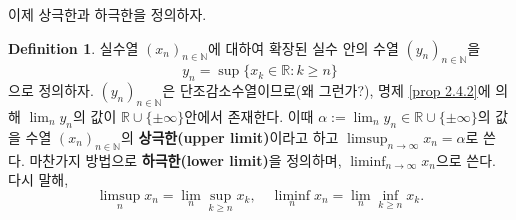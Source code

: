 \documentclass[11pt]{book}
\numberwithin{equation}{chapter}
\def\NN{\mathbb{N}}
\def\RR{\mathbb{R}}
\theoremstyle{definition}
\newtheorem{defn}[thm]{Definition}
\begin{document}
이제 상극한과 하극한을 정의하자.

    \begin{defn} \label{def 2.4.3}
        실수열 \((x_n)_{n \in \NN}\)에 대하여 확장된 실수 안의 수열 \((y_n)_{n \in \NN}\)을
        \[
        y_n = \sup \{x_k \in \RR : k \ge n\}    
        \]
        으로 정의하자. \((y_n)_{n \in \NN}\)은 단조감소수열이므로(왜 그런가?), 명제 \ref{prop 2.4.2}에 의해 \(\lim_{n} y_n\)의 값이 \(\RR \cup \{\pm \infty\}\)안에서 존재한다. 이때 \(\alpha := \lim_{n} y_n \in \RR \cup \{\pm \infty\}\)의 값을 수열 \((x_n)_{n \in \NN}\)의 \textbf{상극한(upper limit)}이라고 하고 \(\limsup_{n \to \infty} x_n = \alpha\)로 쓴다. 마찬가지 방법으로 \textbf{하극한(lower limit)}을 정의하며, \(\liminf_{n \to \infty} x_n\)으로 쓴다. 다시 말해,
        \[
        \limsup_{n} x_n = \lim_n \sup_{k \ge n} x_k, \quad \liminf_{n} x_n = \lim_n \inf_{k \ge n} x_k.
        \]
    \end{defn}
\end{document}
